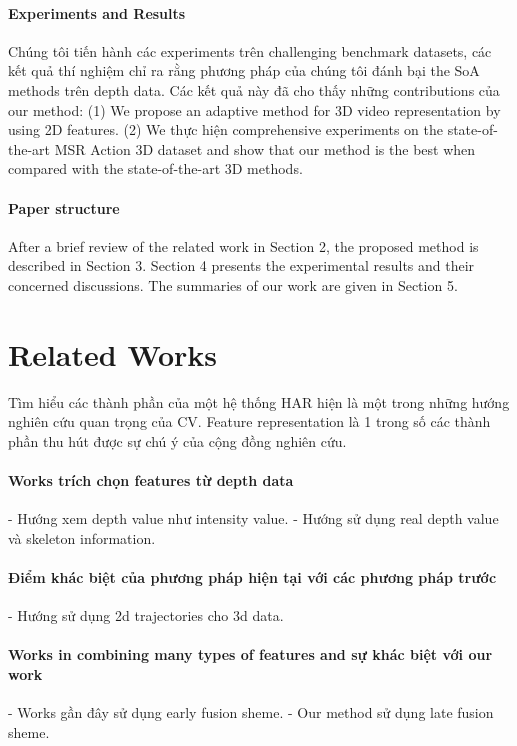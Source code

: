 \documentclass[review]{elsarticle}
\begin{document}
\paragraph{Experiments and Results}Chúng tôi tiến hành các experiments trên challenging benchmark datasets, các kết quả thí nghiệm chỉ ra rằng phương pháp của chúng tôi đánh bại the SoA methods trên depth data. Các kết quả này đã cho thấy những contributions của our method: (1) We propose an adaptive method for 3D video representation by using 2D features. (2) We thực hiện comprehensive experiments on the state-of-the-art MSR Action 3D dataset and show that our method is the best when compared with the state-of-the-art 3D methods.

\paragraph{Paper structure}After a brief review of the related work in Section 2, the proposed method is described in Section 3. Section 4 presents the experimental results and their concerned discussions. The summaries of our work are given in Section 5.

\section{Related Works}

Tìm hiểu các thành phần của một hệ thống HAR hiện là một trong những hướng nghiên cứu quan trọng của CV.
Feature representation là 1 trong số các thành phần thu hút được sự chú ý của cộng đồng nghiên cứu.

\paragraph{Works trích chọn features từ depth data}
- Hướng xem depth value như intensity value.
- Hướng sử dụng real depth value và skeleton information.

\paragraph{Điểm khác biệt của phương pháp hiện tại với các phương pháp trước}
- Hướng sử dụng 2d trajectories cho 3d data.

\paragraph{Works in combining many types of features and sự khác biệt với our work}
- Works gần đây sử dụng early fusion sheme.
- Our method sử dụng late fusion sheme.
\end{document}
